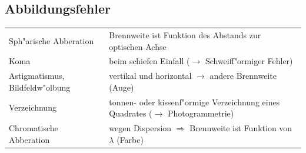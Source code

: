 \subsection{Abbildungsfehler}
\begin{tabular}{ll}
  Sph"arische Abberation & Brennweite ist Funktion des Abstands zur optischen
  Achse \\
  Koma & beim schiefen Einfall ($\rightarrow$ Schweiff"ormiger Fehler) \\
  Astigmatismus, Bildfeldw"olbung & vertikal und horizontal $\rightarrow$ andere
  Brennweite (Auge) \\
  Verzeichnung & tonnen- oder kissenf"ormige Verzeichnung eines Quadrates
  ($\rightarrow$ Photogrammetrie) \\
  Chromatische Abberation & wegen Dispersion $\Rightarrow$ Brennweite ist
  Funktion von $\lambda$ (Farbe) \\
\end{tabular}